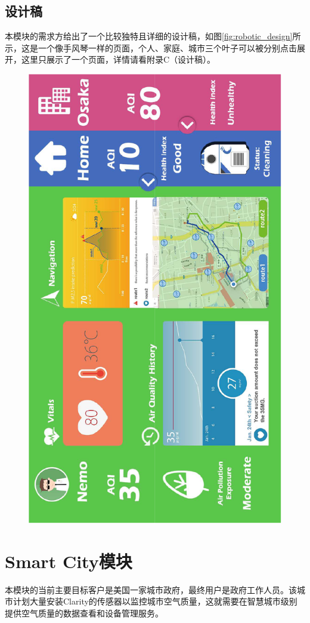 \subsection{设计稿}
本模块的需求方给出了一个比较独特且详细的设计稿，如图\ref{fig:robotic_design}所示，这是一个像手风琴一样的页面，个人、家庭、城市三个叶子可以被分别点击展开，这里只展示了一个页面，详情请看附录C（设计稿）。
\begin{figure}[H]
 \centering
 \includegraphics[height=0.8\linewidth, page=2, angle=-90]{pdf/robotic_design.pdf}
\end{figure}

\section{Smart City模块}
本模块的当前主要目标客户是美国一家城市政府，最终用户是政府工作人员。该城市计划大量安装Clarity的传感器以监控城市空气质量，这就需要在智慧城市级别提供空气质量的数据查看和设备管理服务。
